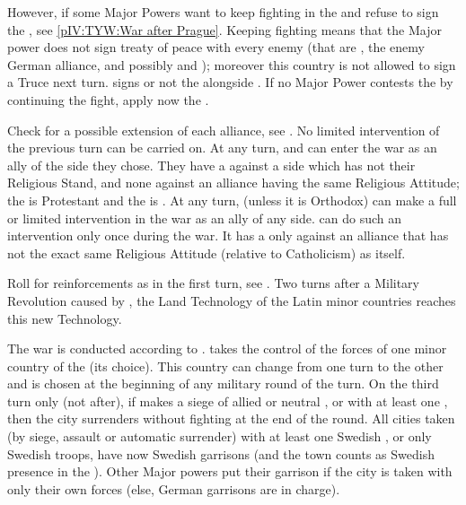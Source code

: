 \bparag However, if some Major Powers want to keep fighting in the \HRE and
refuse to sign the , see \ref{pIV:TYW:War after
  Prague}. Keeping fighting means that the Major power does not sign treaty of
peace with every enemy (that are \MAJ, the enemy German alliance, and possibly
\HOLmin and \DANmin); moreover this country is not allowed to sign a Truce
next turn. \AUSMin signs or not the  alongside
\SPA.
\bparag If no Major Power contests the  by
continuing the fight, apply now the .


\phevnt
\aparag Check for a possible extension of each alliance, see
.
\aparag No limited intervention of the previous turn can be carried on.
\aparag At any turn, \FRA and \ENG can enter the war as an ally of the side
they chose. They have a \CB against a side which has not their Religious
Stand, and none against an alliance having the same Religious Attitude; the
\alliance is Protestant and the \ligue is \CATHCR.
\aparag At any turn, \POL (unless it is Orthodox) can make a full or limited
intervention in the war as an ally of any side. \POL can do such an
intervention only once during the war. It has a \CB only against an alliance
that has not the exact same Religious Attitude (relative to Catholicism) as
itself.

\phadm
\aparag Roll for reinforcements as in the first turn, see
.
\aparag Two turns after a Military Revolution caused by \SUE, the Land
Technology of the Latin minor countries reaches this new Technology.

\phmil
\aparag The war is conducted according to .
\aparag \SUE takes the control of the forces of one minor country of the
\alliance (its choice). This country can change from one turn to the other and
is chosen at the beginning of any military round of the turn.
\aparag On the third turn only (not after), if \SUE makes a siege of allied or
neutral \provinceMecklenburg,  or  with at least one \ARMY \faceplus, then the city surrenders without
fighting at the end of the round.
\aparag All cities taken (by siege, assault or automatic surrender) with at
least one Swedish \ARMY, or only Swedish troops, have now Swedish garrisons
(and the town counts as Swedish presence in the \HRE).  Other Major powers put
their garrison if the city is taken with only their own forces (else, German
garrisons are in charge).

